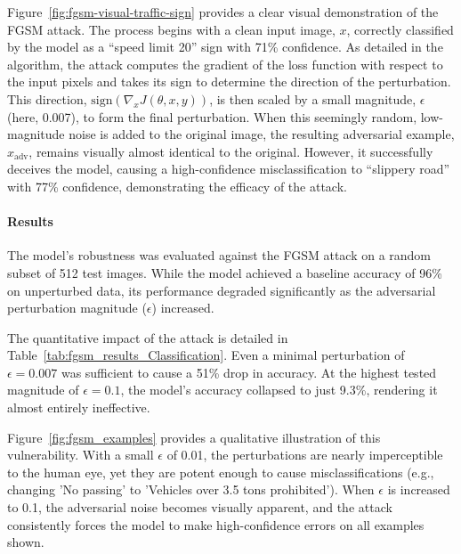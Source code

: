 \documentclass[../main.tex]{subfiles}
\begin{document}
Figure~\ref{fig:fgsm-visual-traffic-sign} provides a clear visual demonstration of the FGSM attack. The process begins with a clean input image, $x$, correctly classified by the model as a ``speed limit 20'' sign with 71\% confidence. As detailed in the algorithm, the attack computes the gradient of the loss function with respect to the input pixels and takes its sign to determine the direction of the perturbation. This direction, $\text{sign}(\nabla_x J(\theta, x, y))$, is then scaled by a small magnitude, $\epsilon$ (here, 0.007), to form the final perturbation. When this seemingly random, low-magnitude noise is added to the original image, the resulting adversarial example, $x_{\text{adv}}$, remains visually almost identical to the original. However, it successfully deceives the model, causing a high-confidence misclassification to ``slippery road'' with 77\% confidence, demonstrating the efficacy of the attack.

\paragraph{Results}
The model's robustness was evaluated against the FGSM attack on a random subset of 512 test images. While the model achieved a baseline accuracy of 96\% on unperturbed data, its performance degraded significantly as the adversarial perturbation magnitude ($\epsilon$) increased.

The quantitative impact of the attack is detailed in Table~\ref{tab:fgsm_results_Classification}. Even a minimal perturbation of $\epsilon=0.007$ was sufficient to cause a 51\% drop in accuracy. At the highest tested magnitude of $\epsilon=0.1$, the model's accuracy collapsed to just 9.3\%, rendering it almost entirely ineffective.

Figure~\ref{fig:fgsm_examples} provides a qualitative illustration of this vulnerability. With a small $\epsilon$ of 0.01, the perturbations are nearly imperceptible to the human eye, yet they are potent enough to cause misclassifications (e.g., changing 'No passing' to 'Vehicles over 3.5 tons prohibited'). When $\epsilon$ is increased to 0.1, the adversarial noise becomes visually apparent, and the attack consistently forces the model to make high-confidence errors on all examples shown.
\end{document}
